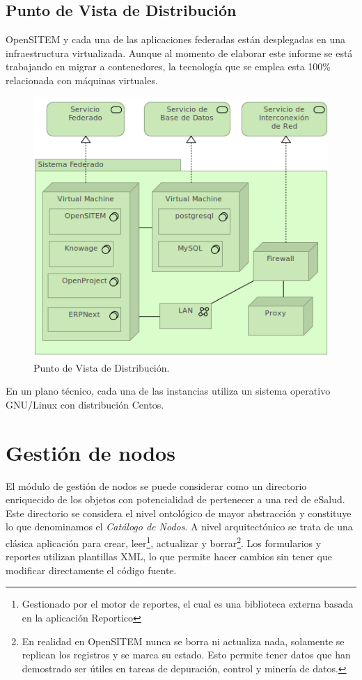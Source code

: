 \subsection{Punto de Vista de Distribución}

OpenSITEM y cada una de las aplicaciones federadas están desplegadas en una infraestructura virtualizada. Aunque al momento de elaborar este informe se está trabajando en migrar a contenedores, la tecnología que se emplea esta 100\% relacionada con máquinas virtuales.

\begin{figure}
 \centering
 \includegraphics[width=120mm]{openSITEM_Vista_Distribucion.png}
 \caption{Punto de Vista de Distribución.}
 \label{punto_infraestructura}
\end{figure}

En un plano técnico, cada una de las instancias utiliza un sistema operativo GNU/Linux con distribución Centos.


\section{Gestión de nodos}

El módulo de gestión de nodos se puede considerar como un directorio enriquecido de los objetos con potencialidad de pertenecer a una red de eSalud. Este directorio se considera el nivel ontológico de mayor abstracción y constituye lo que denominamos el \textit{Catálogo de Nodos}. A nivel arquitectónico se trata de una clásica aplicación para crear, leer\footnote{Gestionado por el motor de reportes, el cual es una biblioteca externa basada en la aplicación Reportico}, actualizar y borrar\footnote{En realidad en OpenSITEM nunca se borra ni actualiza nada, solamente se replican los registros y se marca su estado. Esto permite tener datos que han demostrado ser útiles en tareas de depuración, control y minería de datos.}. Los formularios y reportes utilizan plantillas XML, lo que permite hacer cambios sin tener que modificar directamente el código fuente.


